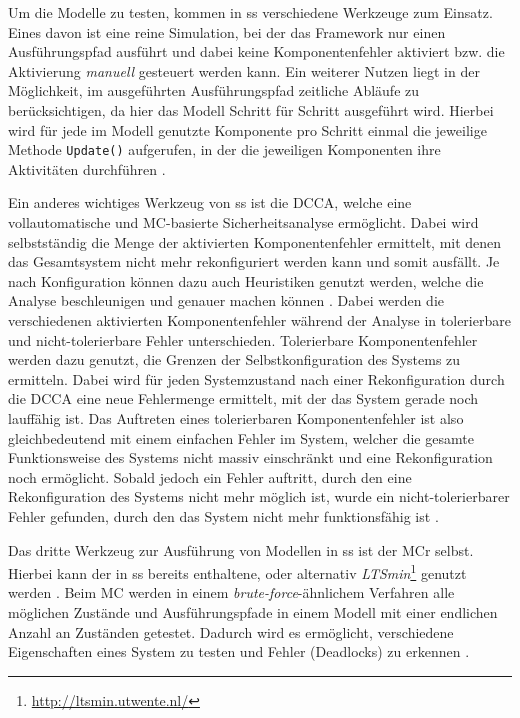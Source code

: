 Um die Modelle zu testen, kommen in \ac{ss} verschiedene Werkzeuge zum Einsatz.
Eines davon ist eine reine Simulation, bei der das Framework nur einen Ausführungspfad ausführt und dabei keine Komponentenfehler aktiviert bzw. die Aktivierung \textit{manuell} gesteuert werden kann.
Ein weiterer Nutzen liegt in der Möglichkeit, im ausgeführten Ausführungspfad zeitliche Abläufe zu berücksichtigen, da hier das Modell Schritt für Schritt ausgeführt wird.
Hierbei wird für jede im Modell genutzte Komponente pro Schritt einmal die jeweilige Methode \texttt{Update()} aufgerufen, in der die jeweiligen Komponenten ihre Aktivitäten durchführen \cite{Habermaier2016}.

Ein anderes wichtiges Werkzeug von \ac{ss} ist die \ac{DCCA}, welche eine vollautomatische und \ac{MC}-basierte Sicherheitsanalyse ermöglicht.
Dabei wird selbstständig die Menge der aktivierten Komponentenfehler ermittelt, mit denen das Gesamtsystem nicht mehr rekonfiguriert werden kann und somit ausfällt.
Je nach Konfiguration können dazu auch Heuristiken genutzt werden, welche die Analyse beschleunigen und genauer machen können \cite{Eberhardinger2016}.
Dabei werden die verschiedenen aktivierten Komponentenfehler während der Analyse in tolerierbare und nicht-tolerierbare Fehler unterschieden.
Tolerierbare Komponentenfehler werden dazu genutzt, die Grenzen der Selbstkonfiguration des Systems zu ermitteln.
Dabei wird für jeden Systemzustand nach einer Rekonfiguration durch die \ac{DCCA} eine neue Fehlermenge ermittelt, mit der das System gerade noch lauffähig ist.
Das Auftreten eines tolerierbaren Komponentenfehler ist also gleichbedeutend mit einem einfachen Fehler im System, welcher die gesamte Funktionsweise des Systems nicht massiv einschränkt und eine Rekonfiguration noch ermöglicht.
Sobald jedoch ein Fehler auftritt, durch den eine Rekonfiguration des Systems nicht mehr möglich ist, wurde ein nicht-tolerierbarer Fehler gefunden, durch den das System nicht mehr funktionsfähig ist \cite{Habermaier2015}.

Das dritte Werkzeug zur Ausführung von Modellen in \ac{ss} ist der \ac{MCr} selbst.
Hierbei kann der in \ac{ss} bereits enthaltene, oder alternativ \emph{LTSmin}\footnote{\url{http://ltsmin.utwente.nl/}} genutzt werden \cite{SSWikiModelChecking}.
Beim \ac{MC} werden in einem \emph{brute-force}-ähnlichem Verfahren alle möglichen Zustände und Ausführungspfade in einem Modell mit einer endlichen Anzahl an Zuständen getestet.
Dadurch wird es ermöglicht, verschiedene Eigenschaften eines System zu testen und Fehler (\zB Deadlocks) zu erkennen \cite{Grumberg1999}.
